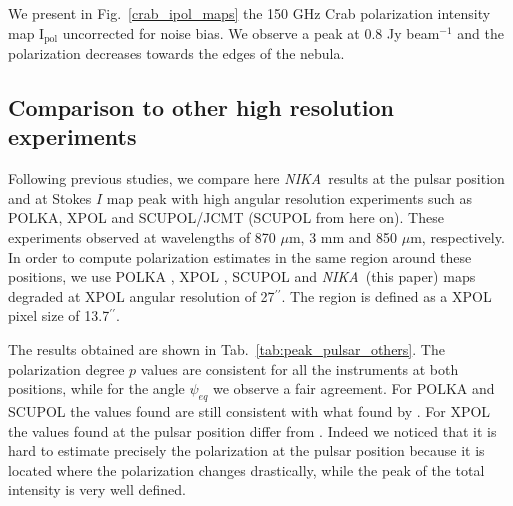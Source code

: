 \documentclass[twocolumn,traditabstract]{aa}
\def\NIKA{\textit{NIKA}}
\begin{document}
We present in Fig.~\ref{crab_ipol_maps} the 150 GHz Crab polarization intensity
map ${\textrm{I}_{\textrm{pol}}}$ uncorrected for noise bias. We observe a peak at 0.8 Jy beam$^{-1}$ and the polarization
decreases towards the edges of the nebula. 

\subsection{Comparison to other high resolution experiments}
Following previous studies, we compare here \NIKA\ results at the pulsar position and at Stokes $I$ map peak with high angular resolution experiments such as POLKA, XPOL and SCUPOL/JCMT (SCUPOL from here on). These experiments observed at wavelengths of 870 $\mu$m, 3 mm and 850 $\mu$m, respectively.
In order to compute polarization estimates in the same region around these positions, we use POLKA \citep{2014PASP..126.1027W}, XPOL \citep{aumont2010}, SCUPOL \citep{scubapol} and \NIKA\ (this paper) maps degraded at XPOL angular resolution of 27$^{\prime\prime}$. The region is defined as a XPOL pixel size of 13.7$^{\prime\prime}$.

The results obtained are shown in Tab.~\ref{tab:peak_pulsar_others}. The polarization degree $p$ values are consistent for all the instruments at both positions, while for the angle $\psi_{eq}$ we observe a fair agreement. For POLKA and SCUPOL the values found are still consistent with what found by \citep{2014PASP..126.1027W}.
For XPOL the values found at the pulsar position differ from \citep{aumont2010}. Indeed we noticed that it is hard to estimate precisely the polarization at the pulsar position because it is located where the polarization changes drastically, while the peak of the total intensity is very well defined. 
\end{document}
